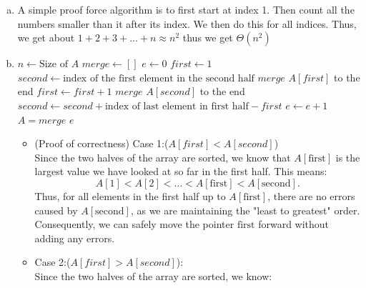 \documentclass[12pt, letterpaper]{article}
\theoremstyle{definition}
\renewcommand{\t}[1]{\text{#1}}
\begin{document}
\begin{enumerate}[(a)]
    \item A simple proof force algorithm is to first start at index 1. Then count all the numbers smaller than it after its index. We then do this for all indices. Thus, we get about $1+2+3+\dots+n \approx n^2$ thus we get $\Theta(n^2)$
    \item \begin{algorithm}
        \begin{algorithmic}[1]
                \State $n \gets \text{Size of $A$}$
                \State $merge \gets []$
                \State $e \gets 0$
                \State $first \gets 1$
                \State $second \gets \text{index of the first element in the second half}$
                        \State $merge$  $A[first]$ to the end
                        \State $first \gets first + 1$
                        \State $merge$  $A[second]$ to the end
                        \State $second \gets second + \t{index of last element in first half}-first$
                        \State $e \gets e + 1$
                    \EndIf
                \EndWhile
                \State $A=merge$
                \State \Return $e$
            \EndFunction
        \end{algorithmic}
    \end{algorithm}
        \begin{itemize}
            \item (Proof of correctness) Case 1:($A[first] < A[second]$)\\
            Since the two halves of the array are sorted, we know that $A[\text{first}]$ is the largest value we have looked at so far in the first half. This means:
            \[
            A[1] < A[2] < \dots < A[\text{first}] < A[\text{second}].
            \]
            Thus, for all elements in the first half up to $A[\text{first}]$, there are no errors caused by $A[\text{second}]$, as we are maintaining the "least to greatest" order. Consequently, we can safely move the pointer $\text{first}$ forward without adding any errors.
            \item Case 2:($A[first] > A[second]$):\\
            Since the two halves of the array are sorted, we know:

\end{itemize}
\end{enumerate}
\end{document}
